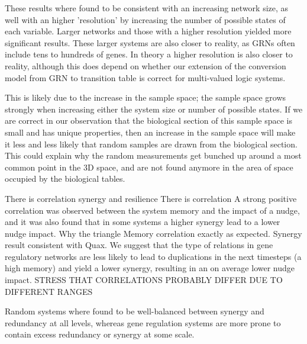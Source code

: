 \documentclass[../main.tex]{subfiles}
\begin{document}
These results where found to be consistent with an increasing network size, as well with an higher 'resolution' by increasing the number of possible states of each variable.
Larger networks and those with a higher resolution yielded more significant results.
These larger systems are also closer to reality, as GRNs often include tens to hundreds of genes.
In theory a higher resolution is also closer to reality, although this does depend on whether our extension of the conversion model from GRN to transition table is correct for multi-valued logic systems.

This is likely due to the increase in the sample space; the sample space grows strongly when increasing either the system size or number of possible states.
If we are correct in our observation that the biological section of this sample space is small and has unique properties, then an increase in the sample space will make it less and less likely that random samples are drawn from the biological section.
This could explain why the random measurements get bunched up around a most common point in the 3D space, and are not found anymore in the area of space occupied by the biological tables.

There is correlation synergy and resilience
There is correlation 
A strong positive correlation was observed between the system memory and the impact of a nudge, and it was also found that in some systems a higher synergy lead to a lower nudge impact.
Why the triangle
Memory correlation exactly as expected.
Synergy result consistent with Quax.
We suggest that the type of relations in gene regulatory networks are less likely to lead to duplications in the next timesteps (a high memory) and yield a lower synergy, resulting in an on average lower nudge impact.
STRESS THAT CORRELATIONS PROBABLY DIFFER DUE TO DIFFERENT RANGES

Random systems where found to be well-balanced between synergy and redundancy at all levels, whereas gene regulation systems are more prone to contain excess redundancy or synergy at some scale.
\end{document}
